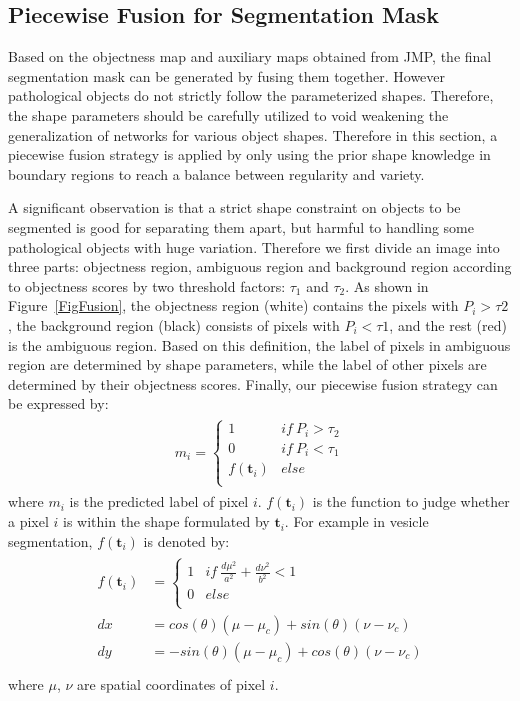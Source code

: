 \subsection{Piecewise Fusion for Segmentation Mask}
\label{sec:fusion}
Based on the objectness map and auxiliary maps obtained from JMP, the final segmentation mask can be generated by fusing them together.
However pathological objects do not strictly follow the parameterized shapes.
Therefore, the shape parameters should be carefully utilized to void weakening the generalization of networks for various object shapes.
Therefore in this section, a piecewise fusion strategy is applied by only using the prior shape knowledge in boundary regions to reach a balance between regularity and variety.

A significant observation is that a strict shape constraint on objects to be segmented is good for separating them apart, but harmful to handling some pathological objects with huge variation.
Therefore we first divide an image into three parts: objectness region, ambiguous region and background region according to objectness scores by two threshold factors: $\tau_1$ and $\tau_2$.
As shown in Figure~\ref{FigFusion}, the objectness region (white) contains the pixels with $P_i>\tau2$, the background region (black) consists of pixels with $P_i<\tau1$, and the rest (red) is the ambiguous region.
Based on this definition, the label of pixels in ambiguous region are determined by shape parameters, while the label of other pixels are determined by their objectness scores.
Finally, our piecewise fusion strategy can be expressed by:
\begin{eqnarray}\label{fusion}
\begin{aligned}
m_i=\left\{\begin{array}{cc}
1&if~P_i>\tau_2\\
0&if~P_i<\tau_1\\
f(\mathbf{t}_i)&else\\
\end{array}\right.
\end{aligned}
\end{eqnarray}
where $m_i$ is the predicted label of pixel $i$.
$f(\mathbf{t}_i)$ is the function to judge whether a pixel $i$ is within the shape formulated by $\mathbf{t}_i$.
For example in vesicle segmentation, $f(\mathbf{t}_i)$ is denoted by:
\begin{eqnarray}\label{fusion1}
\begin{aligned}
f(\mathbf{t}_i)&=\left\{\begin{array}{cc}
1&if~\frac{d\mu^2}{a^2}+\frac{d\nu^2}{b^2}<1\\
0&else\\
\end{array}\right.\\
dx &= cos(\theta)(\mu-\mu_c)+sin(\theta)(\nu-\nu_c)\\
dy &= -sin(\theta)(\mu-\mu_c)+cos(\theta)(\nu-\nu_c)\\
\end{aligned}
\end{eqnarray}
where $\mu$, $\nu$ are spatial coordinates of pixel $i$.


